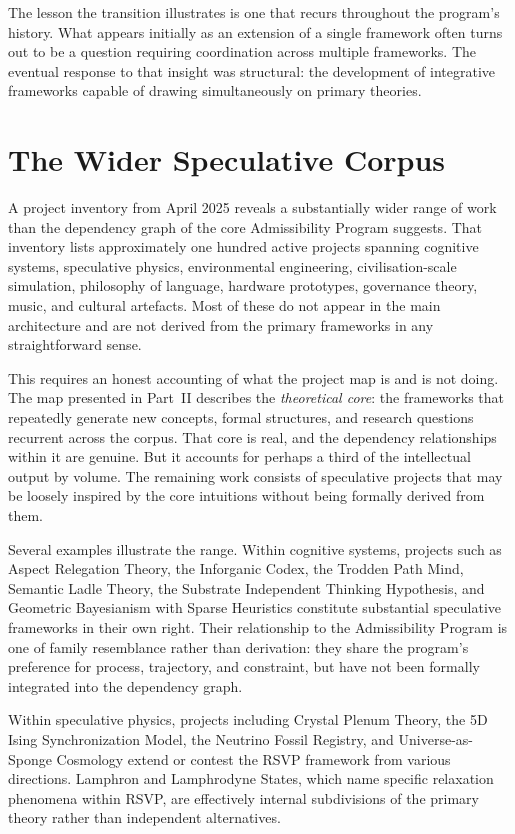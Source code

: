 \documentclass[12pt, twoside]{article}
\begin{document}
The lesson the transition illustrates is one that recurs throughout the
program's history. What appears initially as an extension of a single
framework often turns out to be a question requiring coordination across
multiple frameworks. The eventual response to that insight was structural: the
development of integrative frameworks capable of drawing simultaneously on
primary theories.

\section{The Wider Speculative Corpus}

A project inventory from April 2025 reveals a substantially wider range of
work than the dependency graph of the core Admissibility Program suggests.
That inventory lists approximately one hundred active projects spanning
cognitive systems, speculative physics, environmental engineering,
civilisation-scale simulation, philosophy of language, hardware prototypes,
governance theory, music, and cultural artefacts. Most of these do not appear
in the main architecture and are not derived from the primary frameworks in
any straightforward sense.

This requires an honest accounting of what the project map is and is not
doing. The map presented in Part~II describes the \emph{theoretical core}:
the frameworks that repeatedly generate new concepts, formal structures, and
research questions recurrent across the corpus. That core is real, and the
dependency relationships within it are genuine. But it accounts for perhaps a
third of the intellectual output by volume. The remaining work consists of
speculative projects that may be loosely inspired by the core intuitions
without being formally derived from them.

Several examples illustrate the range. Within cognitive systems, projects
such as Aspect Relegation Theory, the Inforganic Codex, the Trodden Path
Mind, Semantic Ladle Theory, the Substrate Independent Thinking Hypothesis,
and Geometric Bayesianism with Sparse Heuristics constitute substantial
speculative frameworks in their own right. Their relationship to the
Admissibility Program is one of family resemblance rather than derivation:
they share the program's preference for process, trajectory, and constraint,
but have not been formally integrated into the dependency graph.

Within speculative physics, projects including Crystal Plenum Theory, the 5D
Ising Synchronization Model, the Neutrino Fossil Registry, and
Universe-as-Sponge Cosmology extend or contest the RSVP framework from
various directions. Lamphron and Lamphrodyne States, which name specific
relaxation phenomena within RSVP, are effectively internal subdivisions of
the primary theory rather than independent alternatives.
\end{document}
